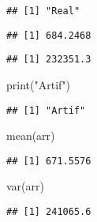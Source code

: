 \documentclass[
]{article}
\newenvironment{Shaded}{\begin{snugshade}}{\end{snugshade}}
\newcommand{\FunctionTok}[1]{\textcolor[rgb]{0.00,0.00,0.00}{#1}}
\newcommand{\NormalTok}[1]{#1}
\newcommand{\SpecialCharTok}[1]{\textcolor[rgb]{0.00,0.00,0.00}{#1}}
\newcommand{\StringTok}[1]{\textcolor[rgb]{0.31,0.60,0.02}{#1}}
\begin{document}
\begin{verbatim}
## [1] "Real"
\end{verbatim}

\begin{Shaded}
\end{Shaded}

\begin{verbatim}
## [1] 684.2468
\end{verbatim}

\begin{Shaded}
\end{Shaded}

\begin{verbatim}
## [1] 232351.3
\end{verbatim}

\begin{Shaded}
\begin{Highlighting}[]
\FunctionTok{print}\NormalTok{(}\StringTok{"Artif"}\NormalTok{)}
\end{Highlighting}
\end{Shaded}

\begin{verbatim}
## [1] "Artif"
\end{verbatim}

\begin{Shaded}
\begin{Highlighting}[]
\FunctionTok{mean}\NormalTok{(arr)}
\end{Highlighting}
\end{Shaded}

\begin{verbatim}
## [1] 671.5576
\end{verbatim}

\begin{Shaded}
\begin{Highlighting}[]
\FunctionTok{var}\NormalTok{(arr)}
\end{Highlighting}
\end{Shaded}

\begin{verbatim}
## [1] 241065.6
\end{verbatim}
\end{document}
